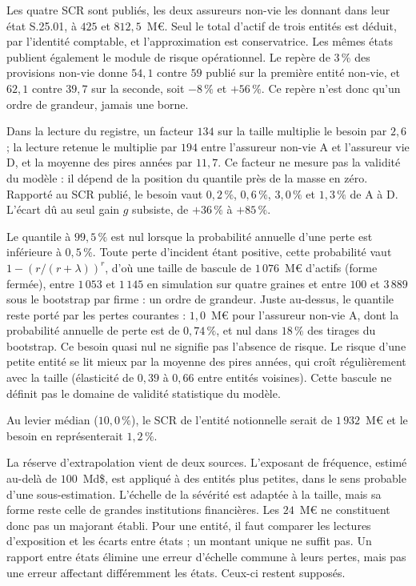 \vspace{2pt}
\noindent Les quatre SCR sont publiés, les deux assureurs non-vie les donnant dans leur état
S.25.01, à $425$ et $812{,}5$~M\euro. Seul le total d'actif de trois entités est déduit, par
l'identité comptable, et l'approximation est conservatrice. Les mêmes états publient également le
module de risque opérationnel. Le repère de $3\,\%$ des provisions non-vie donne $54{,}1$ contre $59$ publié
sur la première entité non-vie, et $62{,}1$ contre $39{,}7$ sur la seconde, soit $-8\,\%$ et $+56\,\%$. Ce
repère n'est donc qu'un ordre de grandeur, jamais une borne.

Dans la lecture du registre, un facteur $134$ sur la taille multiplie le besoin par $2{,}6$ ; la lecture
retenue le multiplie par $194$ entre l'assureur non-vie A et l'assureur vie D, et la moyenne des pires
années par $11{,}7$. Ce facteur ne mesure pas la validité du modèle : il dépend de la position du quantile
près de la masse en zéro. Rapporté au SCR publié, le besoin vaut
$0{,}2\,\%$, $0{,}6\,\%$, $3{,}0\,\%$ et $1{,}3\,\%$ de A à D. L'écart dû au seul gain $g$ subsiste, de $+36\,\%$
à $+85\,\%$.

Le quantile à $99{,}5\,\%$ est nul lorsque la probabilité annuelle d'une perte est inférieure à $0{,}5\,\%$.
Toute perte d'incident étant positive, cette probabilité vaut $1-(r/(r+\lambda))^r$, d'où une taille de bascule
de $1\,076$~M\euro{} d'actifs (forme fermée), entre $1\,053$ et $1\,145$ en simulation sur quatre graines et entre $100$ et
$3\,889$ sous le bootstrap par firme : un ordre de grandeur. Juste au-dessus, le quantile reste porté par les
pertes courantes : $1{,}0$~M\euro{} pour l'assureur non-vie A, dont la probabilité annuelle de perte est de
$0{,}74\,\%$, et nul dans $18\,\%$ des tirages du bootstrap. Ce besoin quasi nul ne signifie pas l'absence de
risque. Le risque d'une petite entité se lit
mieux par la moyenne des pires années, qui croît régulièrement avec la taille (élasticité de $0{,}39$ à
$0{,}66$ entre entités voisines). Cette bascule ne définit pas le domaine de validité statistique du modèle.

Au levier médian ($10{,}0\,\%$), le SCR de l'entité notionnelle serait de $1\,932$~M\euro{} et le besoin
en représenterait $1{,}2\,\%$.

La réserve d'extrapolation vient de deux sources. L'exposant de fréquence, estimé au-delà de
$100$~Md\$, est appliqué à des entités plus petites, dans le sens probable d'une sous-estimation. L'échelle de la sévérité est adaptée à la taille,
mais sa forme reste celle de grandes institutions financières. Les $24$~M\euro{} ne constituent donc pas
un majorant établi. Pour une entité, il faut comparer les lectures d'exposition et les écarts entre
états ; un montant unique ne suffit pas. Un rapport entre états élimine une erreur d'échelle
commune à leurs pertes, mais pas une erreur affectant différemment les états. Ceux-ci restent supposés.

